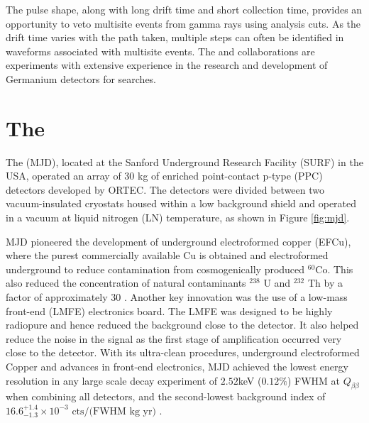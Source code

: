 The pulse shape, along with long drift time and short collection time, provides an opportunity to veto multisite events from gamma rays using analysis cuts. As the drift time varies with the path taken, multiple steps can often be identified in waveforms associated with multisite events. The {\MJ} and {\Gerda} collaborations are experiments with extensive experience in the research and development of Germanium detectors for {\onbb} searches.


\section{The {\MJD}}

The {\MJD} (MJD), located at the Sanford Underground Research Facility (SURF) in the USA, operated an array of 30 kg of enriched point-contact p-type (PPC) detectors developed by ORTEC. The detectors were divided between two vacuum-insulated cryostats housed within a low background shield and operated in a vacuum at liquid nitrogen (LN) temperature, as shown in Figure \ref{fig:mjd}. 

MJD pioneered the development of underground electroformed copper (EFCu), where the purest commercially available Cu is obtained and electroformed underground to reduce contamination from cosmogenically produced $^{60}$Co. This also reduced the concentration of natural contaminants $^{238}$ U and $^{232}$ Th by a factor of approximately 30 \cite{Abgrall:2016cct}. Another key innovation was the use of a low-mass front-end (LMFE) electronics board. The LMFE was designed to be highly radiopure and hence reduced the background close to the detector. It also helped reduce the noise in the signal as the first stage of amplification occurred very close to the detector. With its ultra-clean procedures, underground electroformed Copper and advances in front-end electronics, MJD achieved the lowest energy resolution in any large scale {\onbb} decay experiment of $2.52$keV ($0.12\%$) FWHM at $Q_{\beta\beta}$ when combining all detectors, and the second-lowest background index of $16.6^{+1.4}_{-1.3} \times 10^{-3} \text{ cts/(FWHM kg yr)}$ \cite{Majorana_final}.

